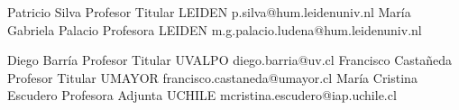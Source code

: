 





\begin{referees}
		{Patricio Silva}
		{Profesor Titular}
		{LEIDEN}
		{p.silva@hum.leidenuniv.nl}
		{María Gabriela Palacio}
		{Profesora}
		{LEIDEN}
		{m.g.palacio.ludena@hum.leidenuniv.nl}
\end{referees}

\begin{referees}
		{Diego Barría}
		{Profesor Titular}
		{UVALPO}
		{diego.barria@uv.cl}
		{Francisco Castañeda}
		{Profesor Titular}
		{UMAYOR}
		{francisco.castaneda@umayor.cl}
		{María Cristina Escudero}
		{Profesora Adjunta}
		{UCHILE}
		{mcristina.escudero@iap.uchile.cl}
\end{referees}